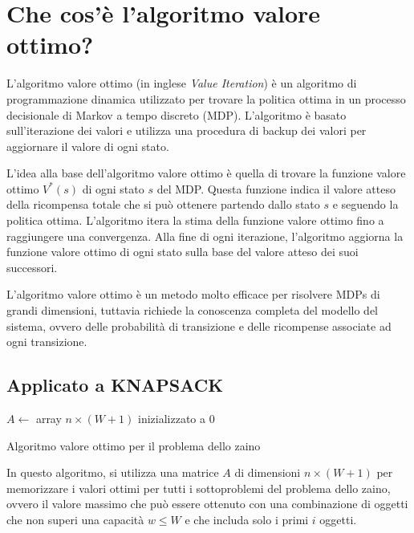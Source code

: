 \section{Che cos'è l'algoritmo valore ottimo?}

L'algoritmo valore ottimo (in inglese \textit{Value Iteration}) è un algoritmo di programmazione dinamica utilizzato per trovare la politica ottima in un processo decisionale di Markov a tempo discreto (MDP). L'algoritmo è basato sull'iterazione dei valori e utilizza una procedura di backup dei valori per aggiornare il valore di ogni stato.

L'idea alla base dell'algoritmo valore ottimo è quella di trovare la funzione valore ottimo $V^*(s)$ di ogni stato $s$ del MDP. Questa funzione indica il valore atteso della ricompensa totale che si può ottenere partendo dallo stato $s$ e seguendo la politica ottima. L'algoritmo itera la stima della funzione valore ottimo fino a raggiungere una convergenza. Alla fine di ogni iterazione, l'algoritmo aggiorna la funzione valore ottimo di ogni stato sulla base del valore atteso dei suoi successori.

L'algoritmo valore ottimo è un metodo molto efficace per risolvere MDPs di grandi dimensioni, tuttavia richiede la conoscenza completa del modello del sistema, ovvero delle probabilità di transizione e delle ricompense associate ad ogni transizione.


\subsection{Applicato a KNAPSACK}

\begin{algorithm}[H]
\SetAlgoLined
{}

$A \gets$ array $n \times (W+1)$ inizializzato a 0\;

\caption{Algoritmo valore ottimo per il problema dello zaino}
\label{alg:valore-ottimo-zaino}
\end{algorithm}

In questo algoritmo, si utilizza una matrice $A$ di dimensioni $n \times (W+1)$ per memorizzare i valori ottimi per tutti i sottoproblemi del problema dello zaino, ovvero il valore massimo che può essere ottenuto con una combinazione di oggetti che non superi una capacità $w \leq W$ e che includa solo i primi $i$ oggetti.

